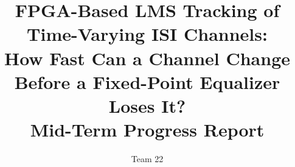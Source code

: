 \documentclass[10pt,twocolumn,letterpaper]{article}
\begin{document}
\title{FPGA-Based LMS Tracking of Time-Varying ISI Channels:\\
How Fast Can a Channel Change Before a Fixed-Point Equalizer Loses It?\\
{\large Mid-Term Progress Report}}

\author{Team 22}
\maketitle












\end{document}
